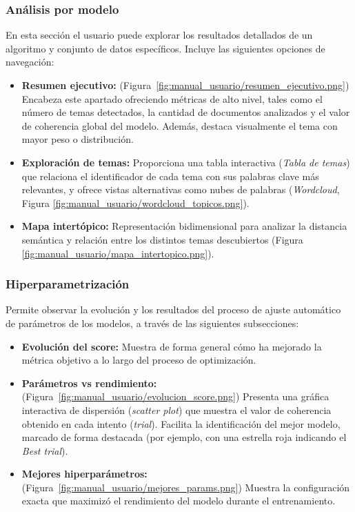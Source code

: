 
\subsubsection{Análisis por modelo}
En esta sección el usuario puede explorar los resultados detallados de un
algoritmo y conjunto de datos específicos. Incluye las siguientes opciones de
navegación:
\begin{itemize}
    \item \textbf{Resumen ejecutivo:} (Figura~\ref{fig:manual_usuario/resumen_ejecutivo.png}) Encabeza este apartado ofreciendo métricas de alto nivel, tales como el número de temas detectados, la cantidad de documentos analizados y el valor de coherencia global del modelo. Además, destaca visualmente el tema con mayor peso o distribución.
    \item \textbf{Exploración de temas:} Proporciona una tabla interactiva (\textit{Tabla de temas}) que relaciona el identificador de cada tema con sus palabras clave más relevantes, y ofrece vistas alternativas como nubes de palabras (\textit{Wordcloud}, Figura \ref{fig:manual_usuario/wordcloud_topicos.png}).
    \item \textbf{Mapa intertópico:} Representación bidimensional para analizar la distancia semántica y relación entre los distintos temas descubiertos (Figura \ref{fig:manual_usuario/mapa_intertopico.png}).
\end{itemize}




\subsubsection{Hiperparametrización}
Permite observar la evolución y los resultados del proceso de ajuste automático
de parámetros de los modelos, a través de las siguientes subsecciones:
\begin{itemize}
    \item \textbf{Evolución del score:} Muestra de forma general cómo ha mejorado la métrica objetivo a lo largo del proceso de optimización.
    \item \textbf{Parámetros vs rendimiento:} (Figura~\ref{fig:manual_usuario/evolucion_score.png}) Presenta una gráfica interactiva de dispersión (\textit{scatter plot}) que muestra el valor de coherencia obtenido en cada intento (\textit{trial}). Facilita la identificación del mejor modelo, marcado de forma destacada (por ejemplo, con una estrella roja indicando el \textit{Best trial}).
    \item \textbf{Mejores hiperparámetros:} (Figura~\ref{fig:manual_usuario/mejores_params.png}) Muestra la configuración exacta que maximizó el rendimiento del modelo durante el entrenamiento.
\end{itemize}

